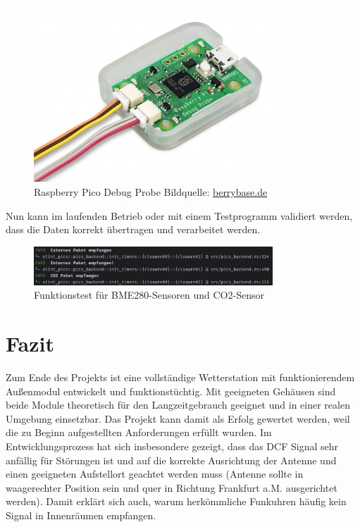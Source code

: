 \documentclass[a4paper,11pt]{article}
\begin{document}
\begin{figure}[H]
	\centering
	\includegraphics[width=0.8\textwidth]{DebugProbe.jpg}
	\caption{Raspberry Pico Debug Probe Bildquelle: \href{https://www.berrybase.de/media/image/c2/87/07/ID_207742_orig_1280x1280.jpg}{berrybase.de}}
	\label{fig:debugprobe}
\end{figure}

\noindent
Nun kann im laufenden Betrieb oder mit einem Testprogramm validiert werden, dass die Daten korrekt übertragen und verarbeitet werden.

\begin{figure}[H]
	\centering
	\includegraphics[width=0.8\textwidth]{FunktionstestGUI-INT-EXT-CO2.png}
	\caption{Funktionstest für BME280-Sensoren und CO2-Sensor}
	\label{fig:funktionstest-dcf-meteo}
\end{figure}


\section{Fazit}
\label{sub:fazit}

Zum Ende des Projekts ist eine vollständige Wetterstation mit funktionierendem Außenmodul entwickelt und funktionstüchtig. Mit geeigneten Gehäusen sind beide
Module theoretisch für den Langzeitgebrauch geeignet und in einer realen Umgebung einsetzbar. Das Projekt kann damit als Erfolg gewertet werden, 
weil die zu Beginn aufgestellten Anforderungen erfüllt wurden. 
Im Entwicklungsprozess hat sich insbesondere gezeigt, dass das DCF Signal sehr anfällig für Störungen ist und auf die korrekte Ausrichtung der Antenne und einen
geeigneten Aufstellort geachtet werden muss (Antenne sollte in waagerechter Position sein und quer in Richtung Frankfurt a.M. ausgerichtet werden). Damit
erklärt sich auch, warum herkömmliche Funkuhren häufig kein Signal in Innenräumen empfangen. 
\end{document}
